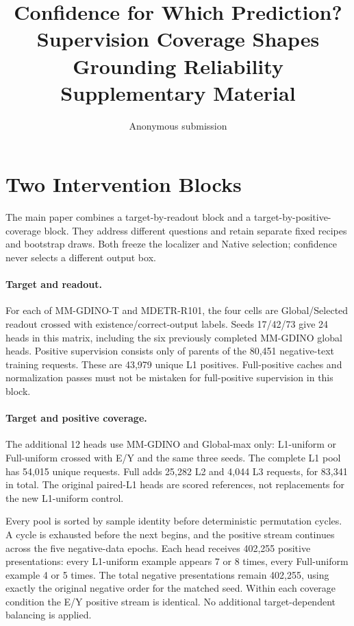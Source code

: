 \documentclass[10pt,twocolumn,letterpaper]{article}
\title{Confidence for Which Prediction?\\
Supervision Coverage Shapes Grounding Reliability\\Supplementary Material}
\author{Anonymous submission}
\begin{document}
\maketitle
\renewcommand{\thesection}{\Alph{section}}

\section{Two Intervention Blocks}
The main paper combines a target-by-readout block and a target-by-positive-coverage
block. They address different questions and retain separate fixed recipes and
bootstrap draws. Both freeze the localizer and Native selection; confidence
never selects a different output box.

\paragraph{Target and readout.}
For each of MM-GDINO-T and MDETR-R101, the four cells are Global/Selected
readout crossed with existence/correct-output labels. Seeds 17/42/73 give
24 heads in this matrix, including the six previously completed MM-GDINO
global heads. Positive supervision consists only of parents of the 80,451
negative-text training requests. These are 43,979 unique L1 positives.
Full-positive caches and normalization passes must not be mistaken for
full-positive supervision in this block.

\paragraph{Target and positive coverage.}
The additional 12 heads use MM-GDINO and Global-max only: L1-uniform or
Full-uniform crossed with E/Y and the same three seeds. The complete
L1 pool has 54,015 unique requests. Full adds 25,282 L2 and 4,044 L3 requests,
for 83,341 in total. The original paired-L1 heads are scored references,
not replacements for the new L1-uniform control.

Every pool is sorted by sample identity before deterministic permutation
cycles. A cycle is exhausted before the next begins, and the positive stream
continues across the five negative-data epochs. Each head receives 402,255
positive presentations: every L1-uniform example appears 7 or 8 times,
every Full-uniform example 4 or 5 times. The total negative presentations
remain 402,255, using exactly the original negative order for the matched seed.
Within each coverage condition the E/Y positive stream is identical.
No additional target-dependent balancing is applied.
\end{document}
